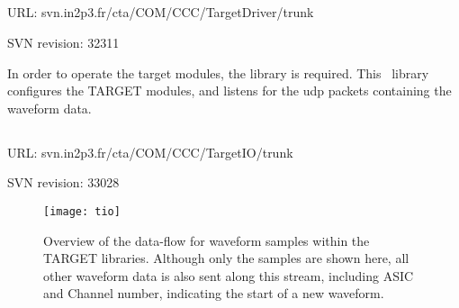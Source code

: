 \subsection{}
\vspace{-0.7em}
\noindent \hspace{\parindent} {\tiny URL: svn.in2p3.fr/cta/COM/CCC/TargetDriver/trunk \par}
\noindent \hspace{\parindent} {\tiny SVN revision: 32311 \par}

\noindent In order to operate the \gls{target} modules, the  library is required. This \cpp~library configures the TARGET modules, and listens for the \gls{udp} packets containing the waveform data.

\subsection{}
\vspace{-0.7em}
\noindent \hspace{\parindent} {\tiny URL: svn.in2p3.fr/cta/COM/CCC/TargetIO/trunk \par}
\noindent \hspace{\parindent} {\tiny SVN revision: 33028 \par}

\begin{figure}
  \centering
  \texttt{[image: tio]}
  \captionsetup{singlelinecheck=off}
  \caption[Data-flow overview for waveform samples within the TARGET libraries]{Overview of the data-flow for waveform samples within the TARGET libraries. Although only the samples are shown here, all other waveform data is also sent along this stream, including ASIC and Channel number, indicating the start of a new waveform. 
  }
  \label{fig:tio}
\end{figure}

